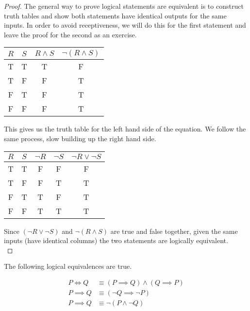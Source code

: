 \documentclass{report}
\begin{document}
\begin{proof}
	The general way to prove logical statements are equivalent is to construct truth tables and show both statements have identical outputs for the same inputs. In order to avoid receptiveness, we will do this for the first statement and leave the proof for the second as an exercise.
	
	\vspace{\baselineskip}
	\begin{center}
		\begin{tabular}{cccc}
			$R$ & $S$ & $R \wedge S$ & $\neg(R \wedge S)$ \\
			\midrule
			T & T & T & F \\
			T & F & F & T \\
			F & T & F & T \\
			F & F & F & T \\
		\end{tabular}
	\end{center}
	\vspace{\baselineskip}
	
	This gives us the truth table for the left hand side of the equation. We follow the same process, slow building up the right hand side.
	
	\vspace{\baselineskip}
	\begin{center}
		\begin{tabular}{ccccc}
			$R$ & $S$ & $\neg R$ & $\neg S$ & $\neg R \lor \neg S$ \\
			\midrule
			T & T & F & F & F \\
			T & F & F & T & T \\
			F & T & T & F & T \\
			F & F & T & T & T \\
		\end{tabular}
	\end{center}
	
	Since $(\neg R \lor \neg S)$ and $\neg(R \wedge S)$ are true and false together, given the same inputs (have identical columns) the two statements are logically equivalent. \\
\end{proof}
\vspace{\baselineskip}

\vspace{\baselineskip}
\begin{theorem}
	The following logical equivalences are true.
	
	\begin{align}
		P \iff Q &\equiv (P \implies Q) \wedge (Q \implies P) \\
		P \implies Q &\equiv (\neg Q \implies \neg P) \\
		P \implies Q &\equiv \neg (P \wedge \neg Q)
	\end{align}
\end{theorem}
\end{document}
